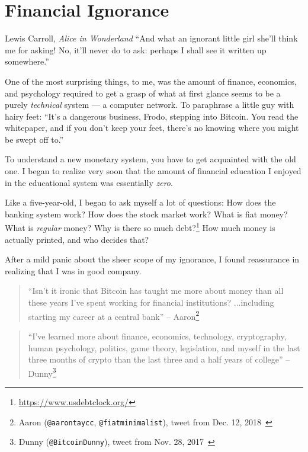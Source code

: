 \chapter{Financial Ignorance}
\label{les:8}

\begin{chapquote}{Lewis Carroll, \textit{Alice in Wonderland}}
``And what an ignorant little girl she'll think me for asking! No, it'll never
do to ask: perhaps I shall see it written up somewhere.''
\end{chapquote}

One of the most surprising things, to me, was the amount of finance,
economics, and psychology required to get a grasp of what at first
glance seems to be a purely \textit{technical} system --- a computer network.
To paraphrase a little guy with hairy feet: \enquote{It's a dangerous business,
Frodo, stepping into Bitcoin. You read the whitepaper, and if you don't
keep your feet, there's no knowing where you might be swept off to.}

To understand a new monetary system, you have to get acquainted with the
old one. I began to realize very soon that the amount of financial
education I enjoyed in the educational system was essentially \textit{zero}.

Like a five-year-old, I began to ask myself a lot of questions: How does the
banking system work? How does the stock market work? What is fiat money? What is
\textit{regular} money? Why is there so much
debt?\footnote{\url{https://www.usdebtclock.org/}} How much money is actually
printed, and who decides that?

After a mild panic about the sheer scope of my ignorance, I found
reassurance in realizing that I was in good company.

\begin{quotation}
``Isn't it ironic that Bitcoin has taught me more about money than all these
years I've spent working for financial institutions? ...including starting my
career at a central bank''
\flushright -- Aaron\footnote{Aaron (\texttt{@aarontaycc}, \texttt{@fiatminimalist}), tweet from Dec.
12, 2018~\cite{aarontaycc-tweet}}
\end{quotation}

\begin{quotation}
``I've learned more about finance, economics, technology, cryptography, human
psychology, politics, game theory, legislation, and myself in the last three
months of crypto than the last three and a half years of college''
\flushright -- Dunny\footnote{Dunny (\texttt{@BitcoinDunny}), tweet from Nov. 28,
2017~\cite{bitcoindunny-tweet}}
\end{quotation}

